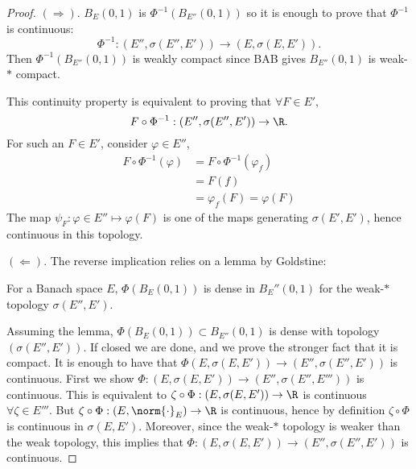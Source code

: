 \documentclass[twoside]{article}
\begin{document}
\begin{proof}
    $(\Rightarrow)$. $B_E(0, 1)$ is $\Phi^{-1}(B_{E''}(0, 1))$ so it is enough to prove that $\Phi^{-1}$ is continuous:
    \begin{equation*}
        \Phi^{-1}: (E'', \sigma(E'', E')) \longrightarrow (E, \sigma(E, E')).
    \end{equation*}
    Then $\Phi^{-1}(B_{E''}(0, 1))$ is weakly compact since BAB gives $B_{E''}(0, 1)$ is weak-$*$ compact.

    This continuity property is equivalent to proving that $\forall F \in E'$,
    \begin{equation*}
        F \circ \Phi^{-1}: (E'', \sigma(E'', E')) \to \R.
    \end{equation*}
    For such an $F \in E'$, consider $\varphi \in E''$,
    \begin{align*}
        F \circ \Phi^{-1} (\varphi) &= F \circ \Phi^{-1} (\varphi_f) \\ %
                                 &= F(f) \\
                                 &=\varphi_f(F) = \varphi(F)
    \end{align*}
    The map $\psi_F: \varphi \in E'' \longmapsto \varphi(F)$ is one of the maps generating $\sigma(E', E')$, hence continuous in this topology.

    $(\Leftarrow)$. The reverse implication relies on a lemma by Goldstine:
    \begin{lemma}
        For a Banach space $E$, $\Phi(B_E(0, 1))$ is dense in $B_E''(0, 1)$ for the weak-$*$ topology $\sigma(E'', E')$.
    \end{lemma}

    Assuming the lemma, $\Phi(B_E(0, 1)) \subset B_{E''}(0, 1)$ is dense with topology $(\sigma(E'', E'))$. If closed %
    we are done, and we prove the stronger fact that it is compact.
    It is enough to have that $\Phi(E, \sigma(E, E')) \to (E'', \sigma(E'', E'))$ is continuous.
    First we show $\Phi: (E, \sigma(E, E')) \to (E'', \sigma(E'', E'''))$ is continuous.
    This is equivalent to $\zeta \circ \Phi: (E, \sigma(E, E')) \to \R$ is continuous $\forall \zeta \in E'''$.
    But $\zeta \circ \Phi: (E, \norm{\cdot}_{E}) \to \R$ is continuous, hence by definition $\zeta \circ \Phi$ is continuous in $\sigma(E, E')$.
    Moreover, since the weak-$*$ topology is weaker than the weak topology, this implies that
    $\Phi: (E, \sigma(E, E')) \to (E'', \sigma(E'', E'))$ is continuous.


\end{proof}
\end{document}

